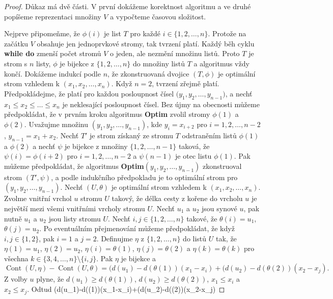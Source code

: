 \documentclass[a4paper,12pt]{article}
\DeclareMathOperator*{\Cont}{Cont}
\begin{document}
\begin{proof}Důkaz má dvě části. V 
první dokážeme korektnost algoritmu a ve druhé popíšeme 
reprezentaci množiny $V$ a vypočteme časovou složitost.

Nejprve připomeňme, že $\phi (i)$ je list $T$ 
pro každé $i\in \{1,2,\dots,n\}$.  Protože na začátku $
V$ 
obsahuje jen 
jednoprvko\-vé stromy, tak tvrzení platí.  Každý běh cyklu 
{\bf while do} zmenší počet stromů $V$ o jeden, ale nezmění 
množinu listů.  Proto $T$ je strom s $n$ listy, $\phi$ je 
bijekce z $\{1,2,\dots,n\}$ do množiny listů $T$ a algoritmus 
vždy končí.  Dokážeme indukcí podle $n$, že zkonstruovaná 
dvojice $(T,\phi )$ je optimální strom vzhledem k $(x_1,x_2
,\dots,x_n)$.  
Když $n=2$, tvrzení zřejmě platí.  Předpokládejme, že 
platí pro každou posloupnost čísel $(y_1,y_2,\dots,$$
y_{n-1})$, a 
nechť $x_1\le x_2\le\dots\le x_n$ je neklesající posloupnost čísel.  Bez újmy na 
obecnosti můžeme předpokládat, že v prvním kroku 
algoritmus {\bf Optim} zvolil stromy $\phi (1)$ a $\phi (2)$.  Uvažujme množinu 
$(y_1,y_2,\dots,y_{n-1})$, kde $y_i=x_{i+2}$ pro $i=1,2,\dots,n-2$, 
$y_{n-1}=x_1+x_2$.  Nechť $T'$ je strom získaný ze stromu $
T$  
odstraněním listů $\phi (1)$ a $\phi (2)$ a nechť $
\psi$ je bijekce z 
množiny $\{1,2,\dots,n-1\}$ taková, že $\psi (i)=\phi (i+
2)$ pro 
$i=1,2,\dots,n-2$ a $\psi (n-1)$ je otec listu $\phi (1)$.  Pak 
můžeme předpokládat, že algoritmus 
{\bf Optim$(y_1,y_2,\dots,y_{n-1})$} zkonstruoval strom $(T',\psi 
)$, a podle indukčního 
předpokladu je to optimální strom pro $(y_1,y_2,\dots,y_{
n-1})$.  Nechť 
$(U,\theta )$ je optimální strom vzhledem k $(x_1,x_2,\dots
,x_n)$.  Zvolme 
vnitřní vrchol $u$ stromu $U$ takový, že délka cesty z kořene 
do vrcholu $u$ je nej\-větší mezi všemi vnitřními vrcholy 
stromu $U$.  Nechť $u_1$ a $u_2$ jsou synové $u$, pak nutně $
u_1$ 
a $u_2$ jsou listy stromu $U$.  Nechť $i,j\in \{1,2,\dots,n\}$ takové, že 
$\theta (i)=u_1$, $\theta (j)=u_2$.  Po eventuálním přejmenování můžeme 
předpokládat, že když $i,j\in \{1,2\}$, pak $i=1$ a 
$j=2$.  Definujme $\eta$ z $\{1,2,\dots,n\}$ do listů $U$ tak, že 
$\eta (1)=u_1$, $\eta (2)=u_2$, $\eta (i)=\theta (1)$, $\eta (j)=
\theta (2)$ a $\eta (k)=\theta (k)$ pro 
všechna $k\in \{3,4,\dots,n\}\setminus \{i,j\}$.  Pak $\eta$ je bijekce a 
$$\Cont(U,\eta )-\Cont(U,\theta )=(d(u_1)-d(\theta (1))(x_1-x_i)+
(d(u_2)-d(\theta (2))(x_2-x_j).$$
Z volby $u$ plyne, že $d(u_1)\ge d(\theta (1))$, $d(u_2)\ge d(
\theta (2))$, 
$x_1\le x_i$ a $x_2\le x_j$. Odtud  
$$(d(u_1)-d(\theta (1))(x_1-x_i)+(d(u_2)-d(\theta (2))(x_2-x_j)\le 

\end{proof}
\end{document}
